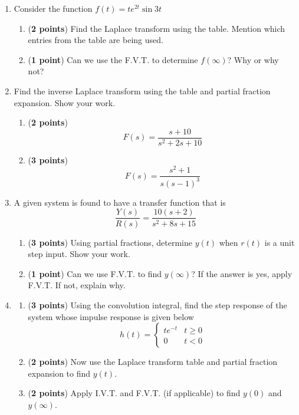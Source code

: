 \documentclass[]{article}
\begin{document}
\begin{enumerate}

    \item Consider the function $f(t)=te^{2t}\sin{3t}$
    \begin{enumerate}
        \item (\textbf{2 points}) Find the Laplace transform using the table. Mention which entries from the table are being used.
        \item (\textbf{1 point}) Can we use the F.V.T. to determine $f(\infty)$? Why or why not?
    \end{enumerate}
    \vspace{0.4 cm}


    \item Find the inverse Laplace transform using the table and partial fraction expansion. Show your work.
    \begin{enumerate}
        \item (\textbf{2 points}) $$F(s)=\frac{s+10}{s^2+2s+10}$$
        \item (\textbf{3 points}) $$F(s)=\frac{s^2+1}{s(s-1)^3}$$
    \end{enumerate}
    \vspace{0.4 cm}

    \item A given system is found to have a transfer function that is
    $$\frac{Y(s)}{R(s)}=\frac{10(s+2)}{s^2+8s+15}$$
    \begin{enumerate}
        \item (\textbf{3 points}) Using partial fractions, determine $y(t)$ when $r(t)$ is a unit step input. Show your work.
        \item (\textbf{1 point}) Can we use F.V.T. to find $y(\infty)$? If the answer is yes, apply F.V.T. If not, explain why.
    \end{enumerate}
    \vspace{0.4 cm}

    \item
    \begin{enumerate}
        \item (\textbf{3 points}) Using the convolution integral, find the step response of the system whose impulse response is given below
        \[
            h(t)=
            \begin{cases}
                te^{-t} & t \geq 0\\
                0       & t < 0
            \end{cases}
        \]
        \item (\textbf{2 points}) Now use the Laplace transform table and partial fraction expansion to find $y(t)$.
        \item (\textbf{2 points}) Apply I.V.T. and F.V.T. (if applicable) to find $y(0)$ and $y(\infty)$.
    \end{enumerate}
    \vspace{0.4 cm}


\end{enumerate}
\end{document}

